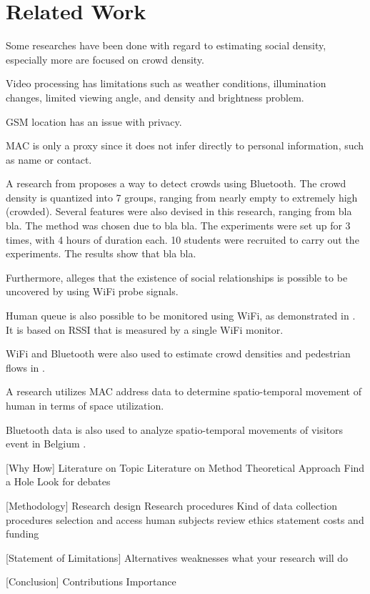 \chapter{Related Work}\label{ch:related-work}

Some researches have been done with regard to estimating social density, especially more are focused on crowd density.

Video processing has limitations such as weather conditions, illumination changes, limited viewing angle, and density and brightness problem. 

GSM location has an issue with privacy\cite{thesis017}.

MAC is only a proxy since it does not infer directly to personal information, such as name or contact.

A research from \cite{thesis008} proposes a way to detect crowds using Bluetooth. The crowd density is quantized into 7 groups, ranging from nearly empty to extremely high (crowded). Several features were also devised in this research, ranging from bla bla. 
The method was chosen due to bla bla.
The experiments were set up for 3 times, with 4 hours of duration each. 10 students were recruited to carry out the experiments.
The results show that bla bla.

Furthermore, \cite{thesis014} alleges that the existence of social relationships is possible to be uncovered by using WiFi probe signals.

Human queue is also possible to be monitored using WiFi, as demonstrated in \cite{thesis012}. It is based on RSSI that is measured by a single WiFi monitor.

WiFi and Bluetooth were also used to estimate crowd densities and pedestrian flows in \cite{thesis011}.

A research \cite{thesis017} utilizes MAC address data to determine spatio-temporal movement of human in terms of space utilization.

Bluetooth data is also used to analyze spatio-temporal movements of visitors event in Belgium \cite{thesis016}.




[Why How]
Literature on Topic
Literature on Method
Theoretical Approach
Find a Hole
Look for debates


[Methodology]
Research design
Research procedures
Kind of data
collection procedures
selection and access
human subjects review
ethics statement
costs and funding

[Statement of Limitations]
Alternatives
weaknesses
what your research will do

[Conclusion]
Contributions
Importance
